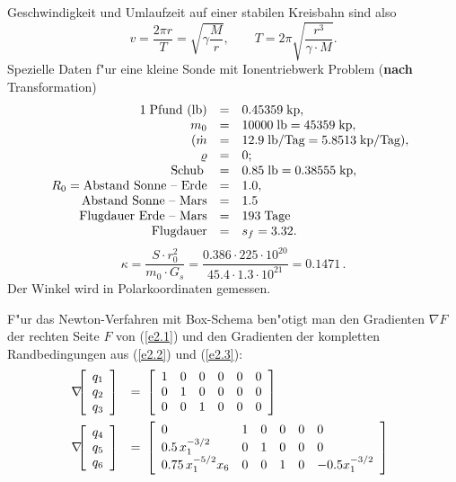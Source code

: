 \documentclass[12pt,a4paper,twoside,leqno]{article}
\begin{document}
Geschwindigkeit und Umlaufzeit auf einer stabilen Kreisbahn sind also
\[
v = \frac{2 \pi r }{T} = \sqrt{\gamma \frac{M}{r}}, \qquad
T = 2\pi \sqrt{\frac{r^3}{\gamma  \cdot M}}.
\]
Spezielle Daten f"ur eine kleine Sonde mit Ionentriebwerk Problem ({\bf nach}
Transformation)
\[ \ba{.}{rcl}
1 \; \mbox{Pfund (lb)}             &=& 0.45359 \; \mbox{kp},\\
m_0 &=& 10 000 \; \mbox{lb}          = 45359 \; \mbox{kp},\\
(\dot{m} &=&  12.9 \; \mbox{lb/Tag} =  5.8513 \; \mbox{kp/Tag}),\\
\rho                               &=& 0;\\
\mbox{Schub} \;  &=& 0.85 \; \mbox{lb} = 0.38555 \; \mbox{kp},\\
R_0 = \mbox{Abstand Sonne -- Erde}    &=& 1.0,\\
\mbox{Abstand Sonne -- Mars}      &=& 1.5\\
\mbox{Flugdauer Erde -- Mars}     &=& 193 \; \mbox{Tage}\\
\mbox{Flugdauer}                  &=& s_f = 3.32.
\ea{.}
\]
%
\[
\kappa = \frac{S\cdot r_0^2}{m_0 \cdot G_s}
=\frac{0.386 \cdot 225 \cdot 10^{20}}{45.4 \cdot 1.3 \cdot 10^{21}}
= 0.1471\, .
\]
%
Der Winkel wird in Polarkoordinaten gemessen.
\par
F"ur das {\sc Newton}-Verfahren mit Box-Schema ben"otigt man den
Gradienten $\nabla F$ der rechten Seite $F$ von (\ref{e2.1})
und den Gradienten der kompletten Randbedingungen
aus (\ref{e2.2}) und (\ref{e2.3}):
\[
\ba{.}{rcl}
\nabla \ba{[}{c}q_1\\q_2\\q_3\ea{]}
&=& \ba{[}{cccccc}
1 & 0 & 0 & 0 & 0 & 0\\
0 & 1 & 0 & 0 & 0 & 0\\
0 & 0 & 1 & 0 & 0 & 0\ea{]}\\[6mm]
%
\nabla \ba{[}{c}q_4\\q_5\\q_6\ea{]}
&=& \ba{[}{llllll}
0        & 1 & 0    & 0    & 0 & 0   \\
0.5\,x_1^{-3/2} & 0 & 1 & 0    & 0 & 0    \\
0.75\,x_1^{-5/2}x_6 & 0 & 0 & 1 & 0 & -0.5x_1^{-3/2} \ea{]}
\ea{.}
\]
%
\newpage
\end{document}
